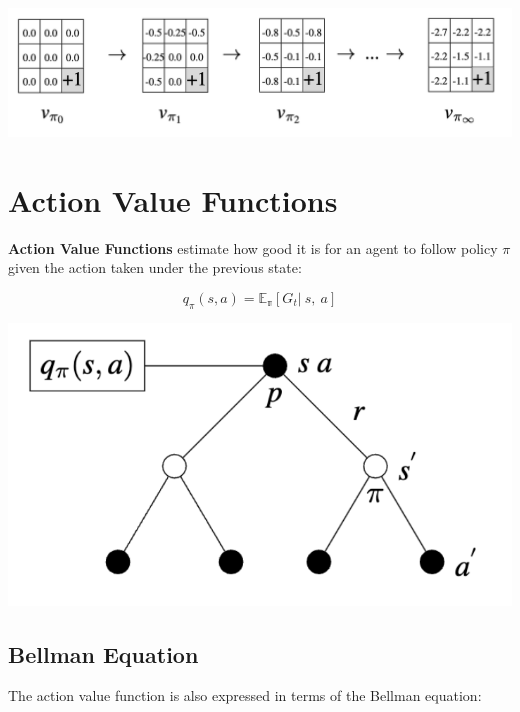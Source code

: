 \documentclass[
  letterpaper,
  DIV=11,
  numbers=noendperiod]{scrreprt}
\begin{document}
\begin{tcolorbox}[enhanced jigsaw, opacityback=0, left=2mm, breakable, bottomtitle=1mm, rightrule=.15mm, colframe=quarto-callout-tip-color-frame, titlerule=0mm, colback=white, opacitybacktitle=0.6, toptitle=1mm, title=\textcolor{quarto-callout-tip-color}{\faLightbulb}\hspace{0.5em}{Solution}, colbacktitle=quarto-callout-tip-color!10!white, bottomrule=.15mm, arc=.35mm, coltitle=black, leftrule=.75mm, toprule=.15mm]

\begin{center}
\includegraphics[width=0.75\linewidth,height=\textheight,keepaspectratio]{lecture4/images/GridWorldSolution.png}
\end{center}

\end{tcolorbox}

\section{Action Value Functions}\label{action-value-functions}

\textbf{Action Value Functions} estimate how good it is for an agent to
follow policy \(\pi\) given the action taken under the previous state:

\[
q_{\pi}(s, a) = \mathbb{E_{\pi}}[G_{t}| \ s, \ a]
\]

\begin{center}
\includegraphics[width=0.35\linewidth,height=\textheight,keepaspectratio]{lecture4/images/ActionValue.png}
\end{center}

\subsection{Bellman Equation}\label{bellman-equation-1}

The action value function is also expressed in terms of the Bellman
equation:
\end{document}
